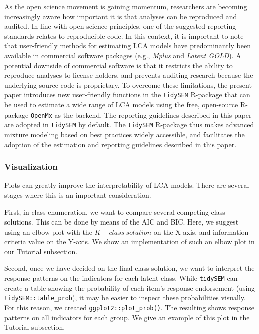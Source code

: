 \documentclass[
  ,man,floatsintext]{apa6}
\begin{document}
As the open science movement is gaining momentum, researchers are
becoming increasingly aware how important it is that analyses can be
reproduced and audited. In line with open science principles, one of the
suggested reporting standards relates to reproducible code. In this
context, it is important to note that user-friendly methods for
estimating LCA models have predominantly been available in commercial
software packages (e.g., \emph{Mplus} and \emph{Latent GOLD}). A potential
downside of commercial software is that it restricts the ability to
reproduce analyses to license holders, and prevents auditing research
because the underlying source code is proprietary. To overcome these
limitations, the present paper introduces new user-friendly functions in
the \texttt{tidySEM} R-package that can be used to estimate a wide range of LCA
models using the free, open-source R-package \texttt{OpenMx} as the backend. The reporting
guidelines described in this paper are adopted in \texttt{tidySEM} by default.
The \texttt{tidySEM} R-package thus makes advanced mixture modeling based on
best practices widely accessible, and facilitates the adoption of the
estimation and reporting guidelines described in this paper.

\hypertarget{visualization}{%
\subsubsection{Visualization}\label{visualization}}

Plots can greatly improve the interpretability of LCA models. There are
several stages where this is an important consideration.

First, in class enumeration, we want to compare several competing class
solutions. This can be done by means of the AIC and BIC. Here, we
suggest using an elbow plot with the \(K-class\ solution\) on the X-axis,
and information criteria value on the Y-axis. We show an implementation
of such an elbow plot in our Tutorial subsection.

Second, once we have decided on the final class solution, we want to
interpret the response patterns on the indicators for each latent class.
While \texttt{tidySEM} can create a table showing the probability of each
item's response endorsement (using \texttt{tidySEM::table\_prob}), it may be
easier to inspect these probabilities visually. For this reason, we
created \texttt{ggplot2::plot\_prob()}. The resulting shows response patterns on
all indicators for each group. We give an example of this plot in the
Tutorial subsection.
\end{document}
